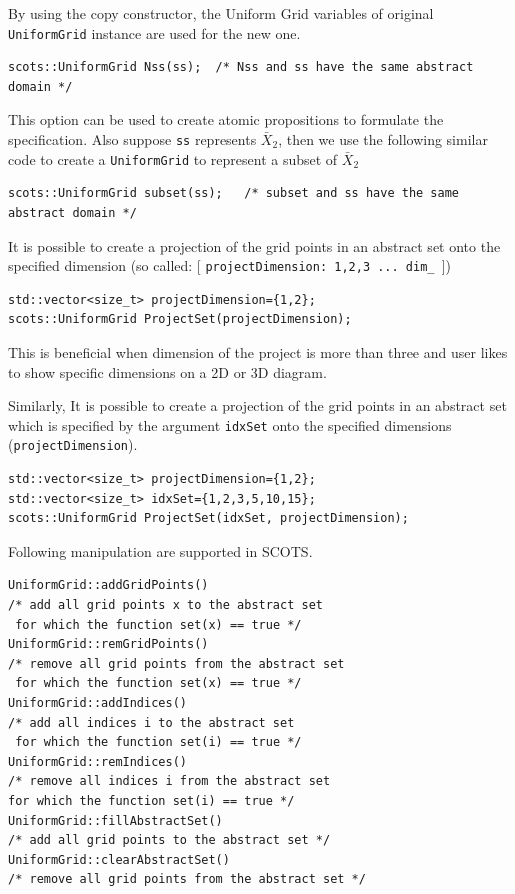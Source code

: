 \documentclass[a4paper]{amsart}
\begin{document}
By using the copy constructor, the Uniform Grid variables of original {\tt\small UniformGrid} instance are used for the new one.
\begin{lstlisting}[basicstyle=\footnotesize\ttfamily]
  scots::UniformGrid Nss(ss);  /* Nss and ss have the same abstract domain */
\end{lstlisting}
This option can be used to create atomic propositions to formulate the specification. Also suppose {\tt\small ss} represents $\bar X_2$, then we use the following similar code to create a {\tt\small UniformGrid} to represent a subset of $\bar X_2$
\begin{lstlisting}[basicstyle=\footnotesize\ttfamily]
  scots::UniformGrid subset(ss);   /* subset and ss have the same abstract domain */
\end{lstlisting}


It is possible to create a projection of the grid points in an abstract set onto the specified dimension (so called: [ {\tt\small projectDimension: 1,2,3 ... dim\_ }])
\begin{lstlisting}[basicstyle=\footnotesize\ttfamily]
std::vector<size_t> projectDimension={1,2};
scots::UniformGrid ProjectSet(projectDimension);

\end{lstlisting}

This is beneficial when dimension of the project is more than three and user likes to show specific dimensions on a 2D or 3D diagram.

Similarly, It is possible to create a projection of the grid points in an abstract set which is specified by the argument {\tt\small idxSet} onto the specified dimensions ({\tt\small projectDimension}).

\begin{lstlisting}[basicstyle=\footnotesize\ttfamily]
std::vector<size_t> projectDimension={1,2};
std::vector<size_t> idxSet={1,2,3,5,10,15};
scots::UniformGrid ProjectSet(idxSet, projectDimension);

\end{lstlisting}


Following manipulation are supported in SCOTS.

\begin{lstlisting}[basicstyle=\footnotesize\ttfamily]
UniformGrid::addGridPoints()
/* add all grid points x to the abstract set
 for which the function set(x) == true */
UniformGrid::remGridPoints()	
/* remove all grid points from the abstract set
 for which the function set(x) == true */
UniformGrid::addIndices()
/* add all indices i to the abstract set
 for which the function set(i) == true */
UniformGrid::remIndices() 
/* remove all indices i from the abstract set
for which the function set(i) == true */
UniformGrid::fillAbstractSet() 
/* add all grid points to the abstract set */
UniformGrid::clearAbstractSet() 
/* remove all grid points from the abstract set */
    
\end{lstlisting}
\end{document}
